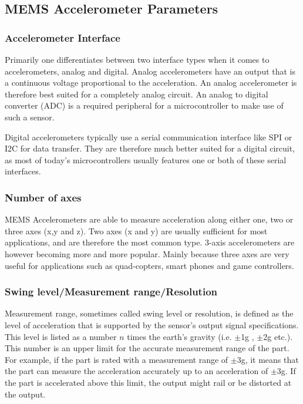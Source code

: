\subsection{MEMS Accelerometer Parameters}

\subsubsection{Accelerometer Interface}

Primarily one differentiates between two interface types when it comes to accelerometers, analog and digital. Analog accelerometers have an output that is a continuous voltage proportional to the acceleration. An analog accelerometer is therefore best suited for a completely analog circuit. An analog to digital converter (ADC) is a required peripheral for a microcontroller to make use of such a sensor.

Digital accelerometers typically use a serial communication interface like SPI or I2C for data transfer. They are therefore much better suited for a digital circuit, as most of today's microcontrollers usually features one or both of these serial interfaces.  

\subsubsection{Number of axes}
MEMS Accelerometers are able to measure acceleration along either one, two or three axes (x,y and z). Two axes (x and y) are usually sufficient for most applications, and are therefore the most common type. 3-axis accelerometers are however becoming more and more popular. Mainly because three axes are very useful for applications such as quad-copters, smart phones and game controllers.

\subsubsection{Swing level/Measurement range/Resolution}
Measurement range, sometimes called swing level or resolution, is defined as the level of acceleration that is supported by the sensor’s output signal specifications. This level is listed as a number $n$ times the earth’s gravity (i.e. $\pm$1g , $\pm$2g etc.). This number is an upper limit for the accurate measurement range of the part. For example, if the part is rated with a measurement range of $\pm$3g, it means that the part can measure the acceleration accurately up to an acceleration of $\pm$3g.  If the part is accelerated above this limit, the output might rail or be distorted at the output.

